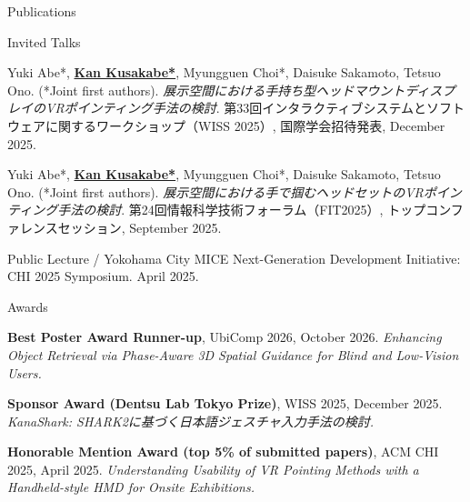 \documentclass[
    11pt, %
]{resume} %
\begin{document}
\begin{rSection}{Publications}
\begin{rSubsection}{Invited Talks}{}{}{}
    \item Yuki Abe*, \underline{\textbf{Kan Kusakabe*}}, Myungguen Choi*, Daisuke Sakamoto, Tetsuo Ono. (*Joint first authors).
    \textit{展示空間における手持ち型ヘッドマウントディスプレイのVRポインティング手法の検討}.
    第33回インタラクティブシステムとソフトウェアに関するワークショップ（WISS 2025）, 国際学会招待発表, December 2025.

    \item Yuki Abe*, \underline{\textbf{Kan Kusakabe*}}, Myungguen Choi*, Daisuke Sakamoto, Tetsuo Ono. (*Joint first authors).
    \textit{展示空間における手で掴むヘッドセットのVRポインティング手法の検討}.
    第24回情報科学技術フォーラム（FIT2025）, トップコンファレンスセッション, September 2025.

    \item Public Lecture / Yokohama City MICE Next-Generation Development Initiative: CHI 2025 Symposium. April 2025.
\end{rSubsection}

\end{rSection}

\begin{rSection}{Awards}
    \item \textbf{Best Poster Award Runner-up}, UbiComp 2026, October 2026. \textit{Enhancing Object Retrieval via Phase-Aware 3D Spatial Guidance for Blind and Low-Vision Users.}
    \item \textbf{Sponsor Award (Dentsu Lab Tokyo Prize)}, WISS 2025, December 2025. \textit{KanaShark: SHARK2に基づく日本語ジェスチャ入力手法の検討.}
    \item \textbf{Honorable Mention Award (top 5\% of submitted papers)}, ACM CHI 2025, April 2025. \textit{Understanding Usability of VR Pointing Methods with a Handheld-style HMD for Onsite Exhibitions.}
\end{rSection}
\end{document}
